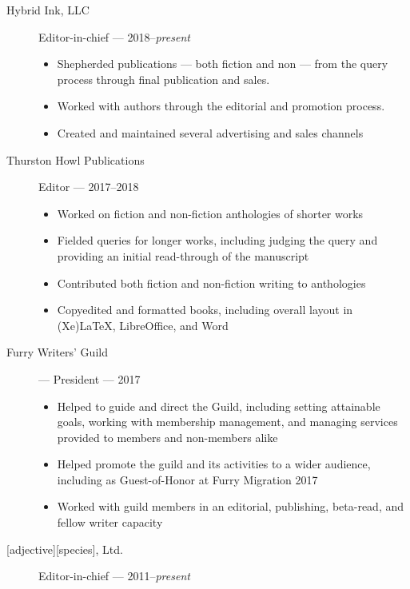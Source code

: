 \begin{description}
\item[Hybrid Ink, LLC]
Editor-in-chief --- 2018--\emph{present}

\begin{itemize}
\tightlist
\item
  Shepherded publications --- both fiction and non --- from the query process through final publication and sales.
\item
  Worked with authors through the editorial and promotion process.
\item
  Created and maintained several advertising and sales channels
\end{itemize}
\item[Thurston Howl Publications]
Editor --- 2017--2018

\begin{itemize}
\tightlist
\item
  Worked on fiction and non-fiction anthologies of shorter works
\item
  Fielded queries for longer works, including judging the query and
  providing an initial read-through of the manuscript
\item
  Contributed both fiction and non-fiction writing to anthologies
\item
  Copyedited and formatted books, including overall layout in (Xe)LaTeX, LibreOffice, and Word
\end{itemize}
\item[Furry Writers' Guild] --- President --- 2017

\begin{itemize}
  \item Helped to guide and direct the Guild, including setting attainable goals, working with membership management, and managing services provided to members and non-members alike
  \item Helped promote the guild and its activities to a wider audience, including as Guest-of-Honor at Furry Migration 2017
  \item Worked with guild members in an editorial, publishing, beta-read, and fellow writer capacity
\end{itemize}
\item[{[}adjective{]}{[}species{]}, Ltd.]
Editor-in-chief --- 2011--\emph{present}


\end{description}
